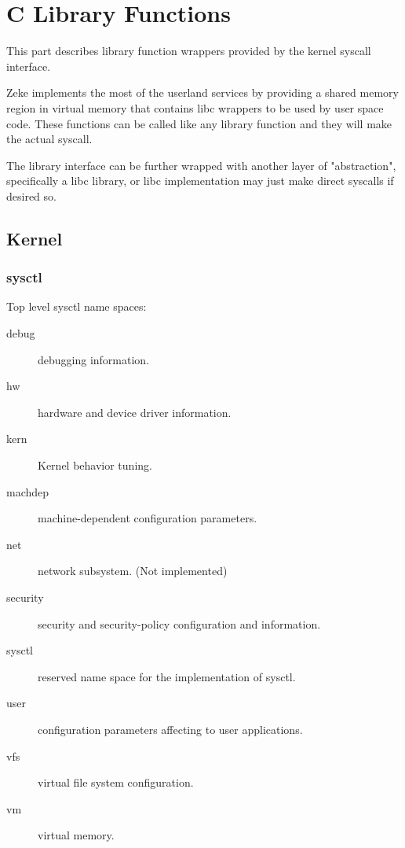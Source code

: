 \part{C Library Functions}

This part describes library function wrappers provided by the kernel syscall
interface.

Zeke implements the most of the userland services by providing a shared memory
region in virtual memory that contains libc wrappers to be used by user space
code. These functions can be called like any library function and they will
make the actual syscall.

The library interface can be further wrapped with another layer of
"abstraction", specifically a libc library, or libc implementation may just
make direct syscalls if desired so.

\chapter{Kernel}
\section{sysctl}

Top level sysctl name spaces:

\begin{description}
\item[debug]    debugging information.
\item[hw]       hardware and device driver information.
\item[kern]     Kernel behavior tuning.
\item[machdep]  machine-dependent configuration parameters.
\item[net]      network subsystem. (Not implemented)
\item[security] security and security-policy configuration and information.
\item[sysctl]   reserved name space for the implementation of sysctl.
\item[user]     configuration parameters affecting to user applications.
\item[vfs]      virtual file system configuration.
\item[vm]       virtual memory.
\end{description}
